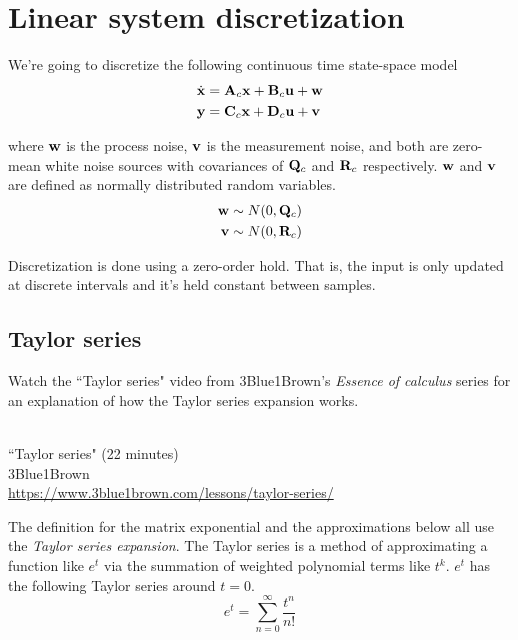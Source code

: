 \section{Linear system discretization}
\label{sec:linear_system_zoh}

We're going to discretize the following continuous time state-space model
\begin{align*}
  \dot{\mathbf{x}} &= \mathbf{A}_c\mathbf{x} + \mathbf{B}_c\mathbf{u} + \mathbf{w} \\
  \mathbf{y} &= \mathbf{C}_c\mathbf{x} + \mathbf{D}_c\mathbf{u} + \mathbf{v}
\end{align*}

where $\mathbf{w}$ is the process noise, $\mathbf{v}$ is the measurement noise, and
both are zero-mean white noise sources with covariances of $\mathbf{Q}_c$ and
$\mathbf{R}_c$ respectively. $\mathbf{w}$ and $\mathbf{v}$ are defined as normally
distributed random variables.
\begin{align*}
  \mathbf{w} &\sim N(0, \mathbf{Q}_c) \\
  \mathbf{v} &\sim N(0, \mathbf{R}_c)
\end{align*}

Discretization is done using a zero-order hold. That is, the input is only
updated at discrete intervals and it’s held constant between samples.

\subsection{Taylor series}
\begin{remark}
  Watch the ``Taylor series" video from 3Blue1Brown's \textit{Essence of
  calculus} series for an explanation of how the Taylor series expansion works.
  \begin{bookfigure}
     \\
    ``Taylor series" (22 minutes) \\
    \footnotesize 3Blue1Brown \\
    \url{https://www.3blue1brown.com/lessons/taylor-series/}
  \end{bookfigure}
\end{remark}

The definition for the matrix exponential and the approximations below all use
the \textit{Taylor series expansion}. The Taylor series is a method of
approximating a function like $e^t$ via the summation of weighted polynomial
terms like $t^k$. $e^t$ has the following Taylor series around $t = 0$.
\begin{equation*}
  e^t = \sum_{n = 0}^\infty \frac{t^n}{n!}
\end{equation*}

